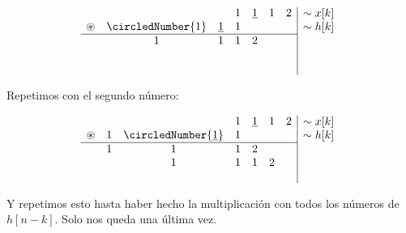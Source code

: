 \documentclass[a4paper]{book}
\begin{document}
\begin{enumerate}
	      \[ \begin{array}{ccccccc}
			                  &                   &               & 1 & \underline{1} & 1 & 2 \\
			      \circledast & \circledNumber{1} & \underline{1} & 1 &               &   &   \\
			      \hline
			                  & 1                 & 1             & 1 & 2             &   &   \\
			                  &                   &               &   &               &   &   \\
			                  &                   &               &   &               &   &
		      \end{array}
		      \begin{array}{|l}
			      \sim x[k]   \\
			      \sim h[k]   \\
			      \phantom{a} \\
			      \phantom{a} \\
			      \phantom{a}
		      \end{array}\]

	      Repetimos con el segundo número:

	      \[ \begin{array}{ccccccc}
			                  &   &                               & 1 & \underline{1} & 1 & 2 \\
			      \circledast & 1 & \circledNumber{\underline{1}} & 1 &               &   &   \\
			      \hline
			                  & 1 & 1                             & 1 & 2             &   &   \\
			                  &   & 1                             & 1 & 1             & 2 &   \\
			                  &   &                               &   &               &   &
		      \end{array}
		      \begin{array}{|l}
			      \sim x[k]   \\
			      \sim h[k]   \\
			      \phantom{a} \\
			      \phantom{a} \\
			      \phantom{a}
		      \end{array}\]

	      Y repetimos esto hasta haber hecho la multiplicación con todos los números de $h[n-k]$. Solo nos queda una última vez.


\end{enumerate}
\end{document}
